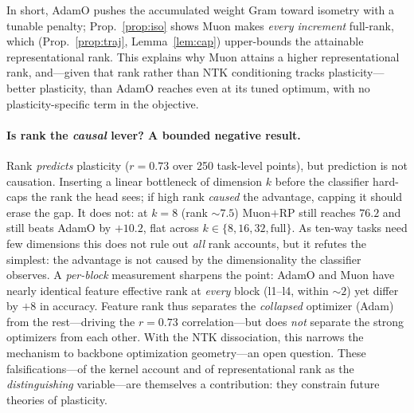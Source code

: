 \documentclass[letterpaper]{article} %
\begin{document}
In short, AdamO pushes the accumulated weight Gram toward isometry with a tunable penalty; Prop.~\ref{prop:iso} shows Muon makes \emph{every increment} full-rank, which (Prop.~\ref{prop:traj}, Lemma~\ref{lem:cap}) upper-bounds the attainable representational rank. This explains why Muon attains a higher representational rank, and---given that rank rather than NTK conditioning tracks plasticity---better plasticity, than AdamO reaches even at its tuned optimum, with no plasticity-specific term in the objective.

\paragraph{Is rank the \emph{causal} lever? A bounded negative result.} Rank \emph{predicts} plasticity ($r{=}0.73$ over 250 task-level points), but prediction is not causation. Inserting a linear bottleneck of dimension $k$ before the classifier hard-caps the rank the head sees; if high rank \emph{caused} the advantage, capping it should erase the gap. It does not: at $k{=}8$ (rank ${\sim}7.5$) Muon$+$RP still reaches $76.2$ and still beats AdamO by $+10.2$, flat across $k\in\{8,16,32,\text{full}\}$. As ten-way tasks need few dimensions this does not rule out \emph{all} rank accounts, but it refutes the simplest: the advantage is not caused by the dimensionality the classifier observes. A \emph{per-block} measurement sharpens the point: AdamO and Muon have nearly identical feature effective rank at \emph{every} block (l1--l4, within ${\sim}2$) yet differ by ${+}8$ in accuracy. Feature rank thus separates the \emph{collapsed} optimizer (Adam) from the rest---driving the $r{=}0.73$ correlation---but does \emph{not} separate the strong optimizers from each other. With the NTK dissociation, this narrows the mechanism to backbone optimization geometry---an open question. These falsifications---of the kernel account and of representational rank as the \emph{distinguishing} variable---are themselves a contribution: they constrain future theories of plasticity.
\end{document}
